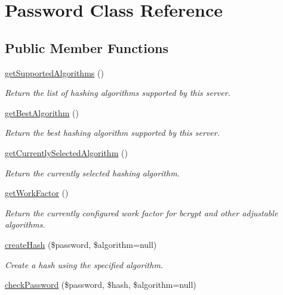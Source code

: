 \hypertarget{classPassword}{\section{Password Class Reference}
\label{classPassword}
}
\subsection*{Public Member Functions}
\begin{DoxyCompactItemize}
\item 
\hyperlink{classPassword_a4983366e7b062e052e6d9f716aa3e59c}{get\-Supported\-Algorithms} ()
\begin{DoxyCompactList}\small\item\em Return the list of hashing algorithms supported by this server. \end{DoxyCompactList}\item 
\hyperlink{classPassword_a191be9b3e77eea80b6d97b7bfaaba288}{get\-Best\-Algorithm} ()
\begin{DoxyCompactList}\small\item\em Return the best hashing algorithm supported by this server. \end{DoxyCompactList}\item 
\hyperlink{classPassword_afd4c3a1daf246f73845a1f0c60cd17d8}{get\-Currently\-Selected\-Algorithm} ()
\begin{DoxyCompactList}\small\item\em Return the currently selected hashing algorithm. \end{DoxyCompactList}\item 
\hyperlink{classPassword_a2c41d8ed7334ffeef9a0b2778b86d8f7}{get\-Work\-Factor} ()
\begin{DoxyCompactList}\small\item\em Return the currently configured work factor for bcrypt and other adjustable algorithms. \end{DoxyCompactList}\item 
\hyperlink{classPassword_a85d7612e366f741aab750d10b415ca48}{create\-Hash} (\$password, \$algorithm=null)
\begin{DoxyCompactList}\small\item\em Create a hash using the specified algorithm. \end{DoxyCompactList}\item 
\hyperlink{classPassword_aa9ea10a8c7fab644cbe255eed95c06e8}{check\-Password} (\$password, \$hash, \$algorithm=null)

\end{DoxyCompactItemize}
